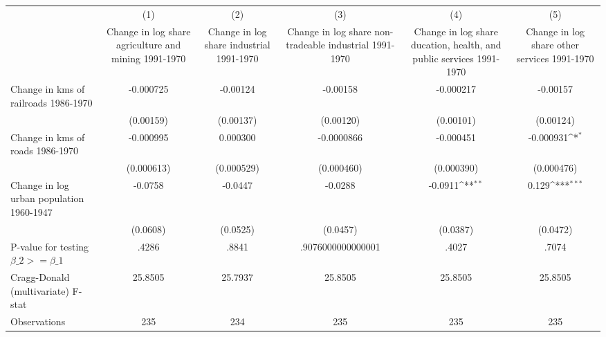 {
\def\sym#1{\ifmmode^{#1}\else\(^{#1}\)\fi}
\begin{tabular}{l*{5}{c}}
\hline\hline
                &\multicolumn{1}{c}{(1)}&\multicolumn{1}{c}{(2)}&\multicolumn{1}{c}{(3)}&\multicolumn{1}{c}{(4)}&\multicolumn{1}{c}{(5)}\\
                &\multicolumn{1}{c}{Change in log share agriculture and mining 1991-1970}&\multicolumn{1}{c}{Change in log share industrial 1991-1970}&\multicolumn{1}{c}{Change in log share non-tradeable industrial 1991-1970}&\multicolumn{1}{c}{Change in log share ducation, health, and public services 1991-1970}&\multicolumn{1}{c}{Change in log share other services 1991-1970}\\
\hline
Change in kms of railroads 1986-1970&-0.000725         & -0.00124         & -0.00158         &-0.000217         & -0.00157         \\
                &(0.00159)         &(0.00137)         &(0.00120)         &(0.00101)         &(0.00124)         \\
[1em]
Change in kms of roads 1986-1970&-0.000995         & 0.000300         &-0.0000866         &-0.000451         &-0.000931\sym{*}  \\
                &(0.000613)         &(0.000529)         &(0.000460)         &(0.000390)         &(0.000476)         \\
[1em]
Change in log urban population 1960-1947&  -0.0758         &  -0.0447         &  -0.0288         &  -0.0911\sym{**} &    0.129\sym{***}\\
                & (0.0608)         & (0.0525)         & (0.0457)         & (0.0387)         & (0.0472)         \\
\hline
P-value for testing $\beta\_{2} >= \beta\_{1}$&    .4286         &    .8841         &.9076000000000001         &    .4027         &    .7074         \\
Cragg-Donald (multivariate) F-stat&  25.8505         &  25.7937         &  25.8505         &  25.8505         &  25.8505         \\
Observations    &      235         &      234         &      235         &      235         &      235         \\
\hline\hline
\end{tabular}
}

